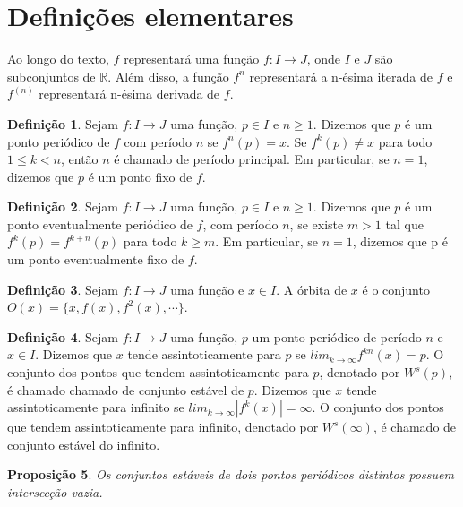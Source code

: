 \documentclass[a4paper, 12pt]{article}
\theoremstyle{definition}
\newtheorem{definition}{Definição}[section]
\theoremstyle{plain}
\newtheorem{proposition}[definition]{Proposição}
\theoremstyle{plain}
\theoremstyle{plain}
\theoremstyle{remark}
\newcommand{\RR}{\mathbb{R}}
\begin{document}
\section{Definições elementares}

Ao longo do texto, $f$ representará uma função $f: I \rightarrow J$, onde $I$ e $J$ são subconjuntos de $\RR$. Além disso, a função $f^n$ representará a n-ésima iterada de $f$ e $f^{(n)}$ representará n-ésima derivada de $f$.
 
\begin{definition}
Sejam $f: I \rightarrow J$ uma função, $p \in I$ e $n \geq 1$.  Dizemos que $p$ é um ponto periódico de $f$ com período $n$ se $f^n(p) = x$. Se $f^k(p) \neq x$ para todo $1 \leq k < n$, então $n$ é chamado de período principal. Em particular, se $n=1$, dizemos que $p$ é um ponto fixo de $f$.
\end{definition}

\begin{definition}
Sejam $f: I \rightarrow J$ uma função, $p \in I$ e $n \geq 1$. Dizemos que $p$ é um ponto eventualmente periódico de $f$, com período $n$, se existe $m > 1$ tal que $f^k(p) = f^{k+n}(p)$ para todo $k \geq m$. Em particular, se $n = 1$, dizemos que p é um ponto eventualmente fixo de $f$.
\end{definition}

\begin{definition}
Sejam $f:I \rightarrow J$ uma função e $x \in I$. A órbita de $x$ é o conjunto $O(x) = \lbrace x, f(x), f^2(x), \cdots \rbrace$.
\end{definition}

\begin{definition}
Sejam $f: I \rightarrow J$ uma função, $p$ um ponto periódico de período $n$ e $x \in I$. Dizemos que $x$ tende assintoticamente para $p$ se $lim_{k \rightarrow \infty} f^{kn}(x) = p$. O conjunto dos pontos que tendem assintoticamente para $p$, denotado por $W^s(p)$, é chamado chamado de conjunto estável de $p$. Dizemos que $x$ tende assintoticamente para infinito se $lim_{k \rightarrow \infty} |f^{k}(x)| = \infty$. O conjunto dos pontos que tendem assintoticamente para infinito, denotado por $W^s(\infty)$, é chamado de conjunto estável do infinito.
\end{definition}

\begin{proposition}
Os conjuntos estáveis de dois pontos periódicos distintos possuem intersecção vazia.
\end{proposition}
\end{document}
